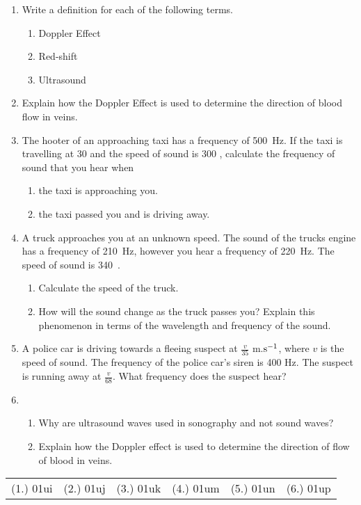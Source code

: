 \begin{eocexercises}{}
\begin{enumerate}
\item{Write a definition for each of the following terms.
\begin{enumerate}
\item Doppler Effect
\item Red-shift
\item Ultrasound
\end{enumerate}}
\item{Explain how the Doppler Effect is used to determine the direction of blood flow in veins.}
\item{The hooter of an approaching taxi has a frequency of 500~Hz. If the taxi is travelling at 30 \ms and the speed of sound is 300 \ms, calculate the frequency of sound that you hear when 
\begin{enumerate}
\item the taxi is approaching you.
\item the taxi passed you and is driving away.
\end{enumerate}}
\item{A truck approaches you at an unknown speed. The sound of the trucks engine has a frequency of 210~Hz, however you hear a frequency of 220~Hz. The speed of sound is 340~\ms.
\begin{enumerate}
\item Calculate the speed of the truck.
\item How will the sound change as the truck passes you? Explain this phenomenon in terms of the wavelength and frequency of the sound.
\end{enumerate}}
\item{A police car is driving towards a fleeing suspect at $\frac{v}{35}$ m.$\rm{s^{-1}}$, where $v$ is the speed of sound. The frequency of the police car's siren is 400 Hz. The suspect is running away at $\frac{v}{68}$. What frequency does the suspect hear?}
\item{\begin{enumerate}
\item Why are ultrasound waves used in sonography and not sound waves?
\item Explain how the Doppler effect is used to determine the direction of flow of blood in veins.
\end{enumerate}}

\end{enumerate}


\par \practiceinfo
\par \begin{tabular}[h]{cccccc}
(1.)	01ui	&
(2.)	01uj	&
(3.)	01uk	&
(4.)	01um	&
(5.)	01un	&
(6.)	01up	\\ %
\end{tabular}
\end{eocexercises}




